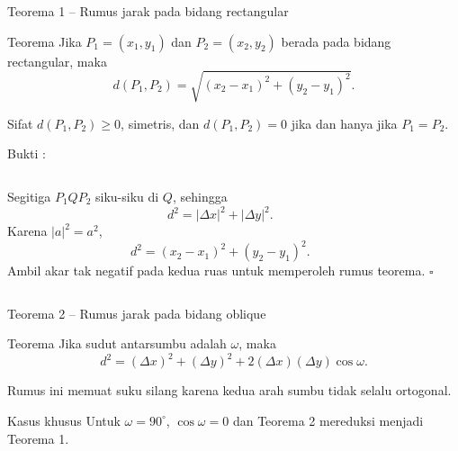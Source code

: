 \documentclass[aspectratio=169,11pt]{beamer}
\begin{document}
\begin{frame}{Teorema 1 -- Rumus jarak pada bidang rectangular}
    \begin{block}{Teorema}
        Jika $P_1=(x_1,y_1)$ dan $P_2=(x_2,y_2)$ berada pada bidang rectangular,
        maka
        \[
            \boxed{d(P_1,P_2)=
            \sqrt{(x_2-x_1)^2+(y_2-y_1)^2}}.
        \]
    \end{block}

    \begin{alertblock}{Sifat}
        $d(P_1,P_2)\ge 0$, simetris, dan $d(P_1,P_2)=0$ jika dan hanya jika
        $P_1=P_2$.
    \end{alertblock}
    
\end{frame}

\begin{frame}{Bukti :}
    \begin{columns}[c]
        \centering

        Segitiga $P_1QP_2$ siku-siku di $Q$, sehingga
        \[
            d^2=|\Delta x|^2+|\Delta y|^2.
        \]
        Karena $|a|^2=a^2$,
        \[
            d^2=(x_2-x_1)^2+(y_2-y_1)^2.
        \]
        Ambil akar tak negatif pada kedua ruas untuk memperoleh rumus teorema.
        \hfill$\square$
    \end{columns}
\end{frame}

\begin{frame}{Teorema 2 -- Rumus jarak pada bidang oblique}
    \begin{block}{Teorema}
        Jika sudut antarsumbu adalah $\omega$, maka
        \[
            \boxed{d^2=(\Delta x)^2+(\Delta y)^2
            +2(\Delta x)(\Delta y)\cos\omega}.
        \]
    \end{block}

    Rumus ini memuat suku silang karena kedua arah sumbu tidak selalu ortogonal.
    \begin{alertblock}{Kasus khusus}
        Untuk $\omega=90^\circ$, $\cos\omega=0$ dan Teorema 2 mereduksi menjadi
        Teorema 1.
    \end{alertblock}
    
\end{frame}
\end{document}
